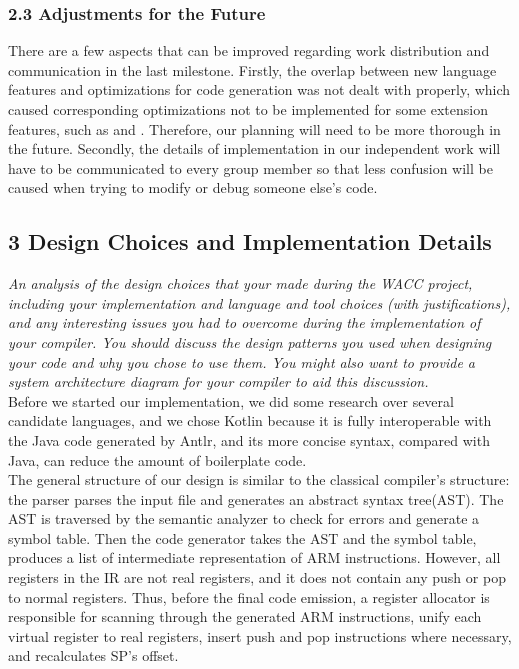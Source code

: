 \documentclass[10pt,a4paper]{report}
\begin{document}
  \subsubsection*{2.3	Adjustments for the Future}
  There are a few aspects that can be improved regarding work distribution and communication
   in the last milestone. Firstly, the overlap between new language features and 
   optimizations for code generation was not dealt with properly, which caused corresponding 
   optimizations not to be implemented for some extension features, such as  and 
   . Therefore, our planning will need to be more thorough in the future. 
   Secondly, the details of implementation in our independent work will have to be communicated 
   to every group member so that less confusion will be caused when trying to modify or debug 
   someone else’s code.

  \subsection*{3 Design Choices and Implementation Details}
  \textit{An analysis of the design choices that your made during the WACC
  project, including your implementation and language and tool choices (with
  justifications), and any interesting issues you had to overcome during the
  implementation of your compiler. You should discuss the design patterns you
  used when designing your code and why you chose to use them. You might also
  want to provide a system architecture diagram for your compiler to aid this
  discussion.}\\
  Before we started our implementation, we did some research over several candidate languages, and we chose Kotlin because it is
  fully interoperable with the Java code generated by Antlr, and its more concise syntax, compared with Java, can reduce the amount 
  of boilerplate code.\\
  The general structure of our design is similar to the classical compiler's structure: the parser parses the input file and generates
  an abstract syntax tree(AST). The AST is traversed by the semantic analyzer to check for errors and generate a symbol table.
  Then the code generator takes the AST and the symbol table, produces a list of intermediate representation of ARM instructions.
  However, all registers in the IR are not real registers, and it does not contain any push or pop to normal registers. Thus, before the
  final code emission, a register allocator is responsible for scanning through the generated ARM instructions, unify each virtual 
  register to real registers, insert push and pop instructions where necessary, and recalculates SP's offset.\\
\end{document}
